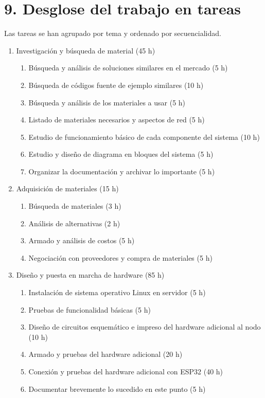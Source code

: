 \documentclass[
11pt, %
]{charter}
\begin{document}
\section{9. Desglose del trabajo en tareas}
\label{sec:wbs}

Las tareas se han agrupado por tema y ordenado por secuencialidad.

\begin{enumerate}
\item Investigación y búsqueda de material (45 h)
	\begin{enumerate}
		\item Búsqueda y análisis de soluciones similares en el mercado (5 h)
		\item Búsqueda de códigos fuente de ejemplo similares (10 h)
		\item Búsqueda y análisis de los materiales a usar (5 h)
		\item Listado de materiales necesarios y aspectos de red (5 h)
		\item Estudio de funcionamiento básico de cada componente del sistema (10 h)
		\item Estudio y diseño de diagrama en bloques del sistema (5 h)
		\item Organizar la documentación y archivar lo importante (5 h)
	\end{enumerate}
\item Adquisición de materiales (15 h)
	\begin{enumerate}
		\item Búsqueda de materiales (3 h)
		\item Análisis de alternativas (2 h)
		\item Armado y análisis de costos (5 h)
		\item Negociación con proveedores y compra de materiales (5 h)
	\end{enumerate}
\item Diseño y puesta en marcha de hardware (85 h)
	\begin{enumerate}
		\item Instalación de sistema operativo Linux en servidor (5 h)
		\item Pruebas de funcionalidad básicas (5 h)
		\item Diseño de circuitos esquemático e impreso del hardware adicional al nodo (10 h)
		\item Armado y pruebas del hardware adicional (20 h)
		\item Conexión y pruebas del hardware adicional con ESP32 (40 h)
		\item Documentar brevemente lo sucedido en este punto (5 h)

\end{enumerate}
\end{enumerate}
\end{document}
